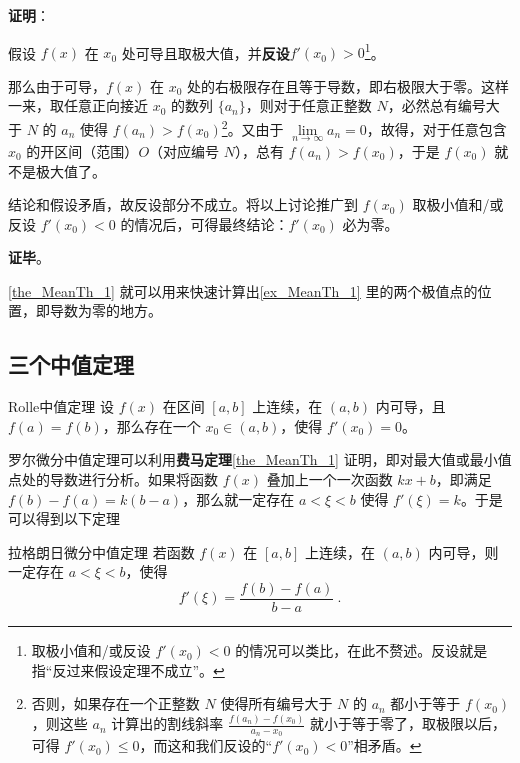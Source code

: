 \textbf{证明}：

假设 $f(x)$ 在 $x_0$ 处可导且取极大值，并\textbf{反设}$f'(x_0)>0$\footnote{取极小值和/或反设 $f'(x_0)<0$ 的情况可以类比，在此不赘述。反设就是指“反过来假设定理不成立”。}。

那么由于可导，$f(x)$ 在 $x_0$ 处的右极限存在且等于导数，即右极限大于零。这样一来，取任意正向接近 $x_0$ 的数列 $\{a_n\}$，则对于任意正整数 $N$，必然总有编号大于 $N$ 的 $a_n$ 使得 $f(a_n)>f(x_0)$\footnote{否则，如果存在一个正整数 $N$ 使得所有编号大于 $N$ 的 $a_n$ 都小于等于 $f(x_0)$，则这些 $a_n$ 计算出的割线斜率 $\frac{f(a_n)-f(x_0)}{a_n-x_0}$ 就小于等于零了，取极限以后，可得 $f'(x_0)\leq 0$，而这和我们反设的“$f'(x_0)<0$”相矛盾。}。又由于 $\lim\limits_{n\to\infty}a_n=0$，故得，对于任意包含 $x_0$ 的开区间（范围）$O$（对应编号 $N$），总有 $f(a_n)>f(x_0)$，于是 $f(x_0)$ 就不是极大值了。

结论和假设矛盾，故反设部分不成立。将以上讨论推广到 $f(x_0)$ 取极小值和/或反设 $f'(x_0)<0$ 的情况后，可得最终结论：$f'(x_0)$ 必为零。

\textbf{证毕}。

\autoref{the_MeanTh_1} 就可以用来快速计算出\autoref{ex_MeanTh_1} 里的两个极值点的位置，即导数为零的地方。


\subsection{三个中值定理}


\begin{definition}{Rolle中值定理}
设 $f(x)$ 在区间 $[a, b]$ 上连续，在 $(a, b)$ 内可导，且 $f(a)=f(b)$，那么存在一个 $x_0\in(a, b)$，使得 $f'(x_0)=0$。
\end{definition}

罗尔微分中值定理可以利用\textbf{费马定理}\autoref{the_MeanTh_1} 证明，即对最大值或最小值点处的导数进行分析。如果将函数 $f(x)$ 叠加上一个一次函数 $kx+b$，即满足 $f(b)-f(a)=k(b-a)$，那么就一定存在 $a< \xi <b$ 使得 $f'(\xi)=k$。于是可以得到以下定理

\begin{theorem}{拉格朗日微分中值定理}\label{the_MeanTh_2}
若函数 $f(x)$ 在 $[a,b]$ 上连续，在 $(a,b)$ 内可导，则一定存在 $a< \xi <b$，使得
\begin{equation}\label{eq_MeanTh_2}
f'(\xi)=\frac{f(b)-f(a)}{b-a}~.
\end{equation}
\end{theorem}

